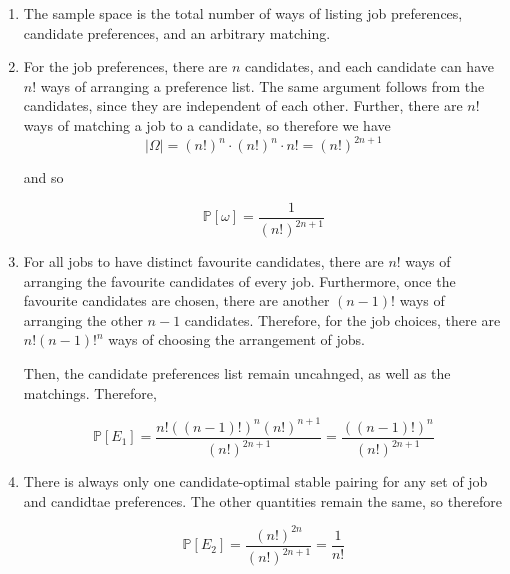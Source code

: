 \documentclass[11pt]{article}
\begin{document}
\begin{Parts}
     \begin{solution}
      \begin{enumerate}
        \item The sample space is the total number of ways of listing job preferences, candidate preferences, and an arbitrary matching. 
        \item For the job preferences, there are $n$ candidates, and each candidate can have $n!$ ways of arranging a preference list. The same argument follows from the candidates, since they are independent of each other. Further, there are $n!$ ways of matching a job to a candidate, so therefore we have 
        \[ |\Omega| = (n!)^n \cdot (n!)^n \cdot n! = (n!)^{2n + 1}\]

        and so 

        \[ \mathbb P[\omega] = \frac{1}{(n!)^{2n + 1}}\]
        \item For all jobs to have distinct favourite candidates, there are $n!$ ways of arranging the favourite candidates of every job. Furthermore, once the favourite candidates are chosen, there are another $(n-1)!$ ways of arranging the other $n-1$ candidates. Therefore, for the job choices, there are $n!(n-1)!^n$ ways of choosing the arrangement of jobs. 
        
        Then, the candidate preferences list remain uncahnged, as well as the matchings. Therefore, 

        \[ \mathbb P[E_1] = \frac{n!((n-1)!)^n (n!)^{n+1}}{(n!)^{2n + 1}} = \frac{((n-1)!)^n}{(n!)^{2n+1}}\]
        \item There is always only one candidate-optimal stable pairing for any set of job and candidtae preferences. The other quantities remain the same, so therefore 
        
        \[ \mathbb P[E_2] = \frac{(n!)^{2n}}{(n!)^{2n + 1}} = \frac{1}{n!}\]
      \end{enumerate}
     \end{solution}
\end{Parts}
\end{document}

